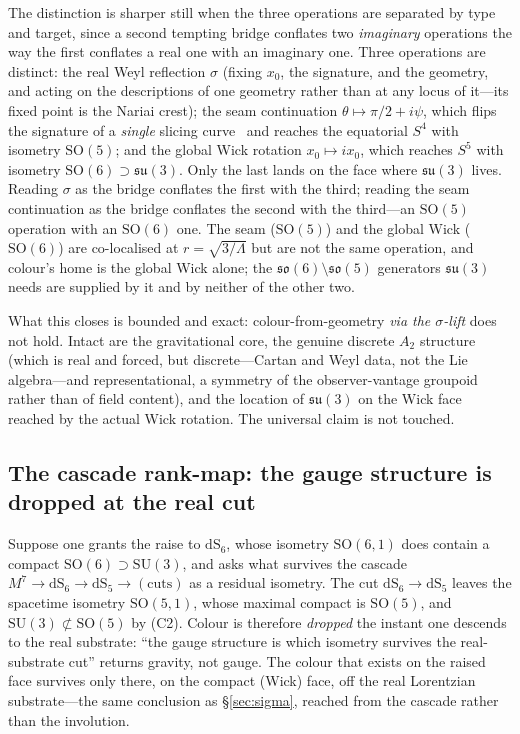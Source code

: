 \documentclass[11pt]{article}
\theoremstyle{plain}
\theoremstyle{remark}
\newcommand{\so}{\mathfrak{so}}
\newcommand{\su}{\mathfrak{su}}
\newcommand{\dS}{\mathrm{dS}}
\newcommand{\SO}{\mathrm{SO}}
\newcommand{\SU}{\mathrm{SU}}
\begin{document}
The distinction is sharper still when the three operations are separated by type and target, since a second tempting bridge conflates two \emph{imaginary} operations the way the first conflates a real one with an imaginary one. Three operations are distinct: the real Weyl reflection $\sigma$ (fixing $x_0$, the signature, and the geometry, and acting on the descriptions of one geometry rather than at any locus of it---its fixed point is the Nariai crest); the seam continuation $\theta\mapsto\pi/2+i\psi$, which flips the signature of a \emph{single} slicing curve~\cite{JanzenSlicing} and reaches the equatorial $S^4$ with isometry $\SO(5)$; and the global Wick rotation $x_0\mapsto ix_0$, which reaches $S^5$ with isometry $\SO(6)\supset\su(3)$. Only the last lands on the face where $\su(3)$ lives. Reading $\sigma$ as the bridge conflates the first with the third; reading the seam continuation as the bridge conflates the second with the third---an $\SO(5)$ operation with an $\SO(6)$ one. The seam ($\SO(5)$) and the global Wick ($\SO(6)$) are co-localised at $r=\sqrt{3/\Lambda}$ but are not the same operation, and colour's home is the global Wick alone; the $\so(6)\setminus\so(5)$ generators $\su(3)$ needs are supplied by it and by neither of the other two.

What this closes is bounded and exact: colour-from-geometry \emph{via the $\sigma$-lift} does not hold. Intact are the gravitational core, the genuine discrete $A_2$ structure (which is real and forced, but discrete---Cartan and Weyl data, not the Lie algebra---and representational, a symmetry of the observer-vantage groupoid rather than of field content), and the location of $\su(3)$ on the Wick face reached by the actual Wick rotation. The universal claim is not touched.

\subsection{The cascade rank-map: the gauge structure is dropped at the real cut}\label{sec:cascade}

Suppose one grants the raise to $\dS_6$, whose isometry $\SO(6,1)$ does contain a compact $\SO(6)\supset\SU(3)$, and asks what survives the cascade $M^7\to\dS_6\to\dS_5\to(\text{cuts})$ as a residual isometry. The cut $\dS_6\to\dS_5$ leaves the spacetime isometry $\SO(5,1)$, whose maximal compact is $\SO(5)$, and $\SU(3)\not\subset\SO(5)$ by (C2). Colour is therefore \emph{dropped} the instant one descends to the real substrate: ``the gauge structure is which isometry survives the real-substrate cut'' returns gravity, not gauge. The colour that exists on the raised face survives only there, on the compact (Wick) face, off the real Lorentzian substrate---the same conclusion as \S\ref{sec:sigma}, reached from the cascade rather than the involution.
\end{document}
